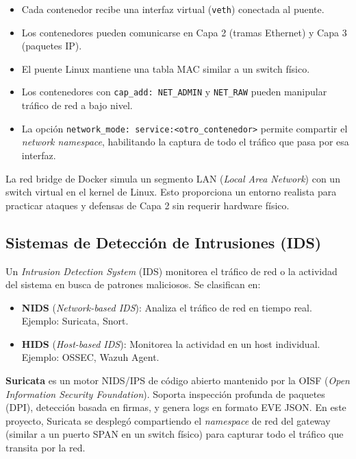 \documentclass[12pt, a4paper]{article}
\begin{document}
\begin{itemize}[leftmargin=2cm]
    \item Cada contenedor recibe una interfaz virtual (\texttt{veth}) conectada al puente.
    \item Los contenedores pueden comunicarse en Capa 2 (tramas Ethernet) y Capa 3 (paquetes IP).
    \item El puente Linux mantiene una tabla MAC similar a un switch f\'isico.
    \item Los contenedores con \texttt{cap\_add: NET\_ADMIN} y \texttt{NET\_RAW} pueden manipular tr\'afico de red a bajo nivel.
    \item La opci\'on \texttt{network\_mode: service:<otro\_contenedor>} permite compartir el \textit{network namespace}, habilitando la captura de todo el tr\'afico que pasa por esa interfaz.
\end{itemize}

\begin{infobox}
La red bridge de Docker simula un segmento LAN (\textit{Local Area Network}) con un switch virtual en el kernel de Linux. Esto proporciona un entorno realista para practicar ataques y defensas de Capa 2 sin requerir hardware f\'isico.
\end{infobox}

\subsection{Sistemas de Detecci\'on de Intrusiones (IDS)}

Un \textit{Intrusion Detection System} (IDS) monitorea el tr\'afico de red o la actividad del sistema en busca de patrones maliciosos. Se clasifican en:

\begin{itemize}[leftmargin=2cm]
    \item \textbf{NIDS} (\textit{Network-based IDS}): Analiza el tr\'afico de red en tiempo real. Ejemplo: Suricata, Snort.
    \item \textbf{HIDS} (\textit{Host-based IDS}): Monitorea la actividad en un host individual. Ejemplo: OSSEC, Wazuh Agent.
\end{itemize}

\textbf{Suricata} es un motor NIDS/IPS de c\'odigo abierto mantenido por la OISF (\textit{Open Information Security Foundation}). Soporta inspecci\'on profunda de paquetes (DPI), detecci\'on basada en firmas, y genera logs en formato EVE JSON. En este proyecto, Suricata se despleg\'o compartiendo el \textit{namespace} de red del gateway (similar a un puerto SPAN en un switch f\'isico) para capturar todo el tr\'afico que transita por la red.
\end{document}

